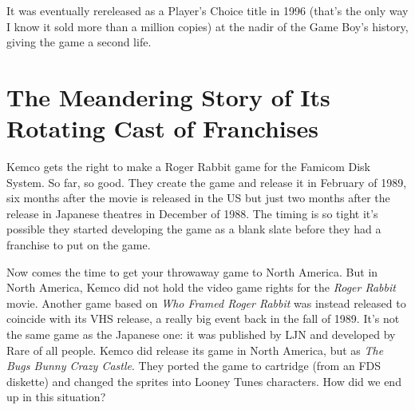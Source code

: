 \documentclass{book}
\begin{document}
It was eventually rereleased as a Player’s Choice title in 1996 (that’s the only way I know it sold more than a million copies) at the nadir of the Game Boy’s history, giving the game a second life.\par
\FloatBarrier\section*{The Meandering Story of Its Rotating Cast of Franchises}
Kemco gets the right to make a Roger Rabbit game for the Famicom Disk System. So far, so good. They create the game and release it in February of 1989, six months after the movie is released in the US but just two months after the release in Japanese theatres in December of 1988. The timing is so tight it’s possible they started developing the game as a blank slate before they had a franchise to put on the game.\par
\FloatBarrier\vspace{\baselineskip}\centering
\begin{minipage}{0.45\linewidth}\captionsetup{labelformat=empty}\end{minipage}\vspace{2pt}
\begin{minipage}{0.45\linewidth}\captionsetup{labelformat=empty}\end{minipage}
\par\justifying
Now comes the time to get your throwaway game to North America. But in North America, Kemco did not hold the video game rights for the \emph{Roger Rabbit} movie. Another game based on \emph{Who Framed Roger Rabbit} was instead released to coincide with its VHS release, a really big event back in the fall of 1989. It’s not the same game as the Japanese one: it was published by LJN and developed by Rare of all people. Kemco did release its game in North America, but as \emph{The Bugs Bunny Crazy Castle}. They ported the game to cartridge (from an FDS diskette) and changed the sprites into Looney Tunes characters. How did we end up in this situation?\par
\end{document}
